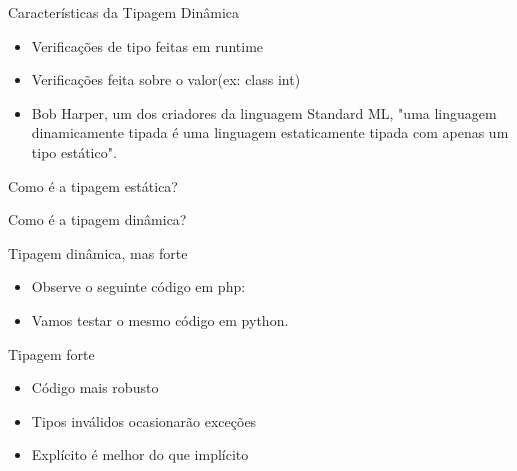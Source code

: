 \begin{frame}{Características da Tipagem Dinâmica}

\begin{itemize}
	\item Verificações de tipo feitas em runtime
	\item Verificações feita sobre o valor(ex: class int)
	\item Bob Harper, um dos criadores da linguagem Standard ML, "uma linguagem dinamicamente tipada é uma linguagem estaticamente tipada com apenas um tipo estático".
\end{itemize}
\end{frame}

\begin{frame}{Como é a tipagem estática?}

\centering {}
\lstset{language=Java}

      
\end{frame}

\begin{frame}{Como é a tipagem dinâmica?}

\centering {}
\lstset{language=Python}


\end{frame}

\begin{frame}{Tipagem dinâmica, mas forte}
\begin{itemize}
	\item Observe o seguinte código em php:
	\lstset{language=php}
	
\end{itemize}
\begin{itemize}
	\item Vamos testar o mesmo código em python.
\end{itemize}

\end{frame}

\begin{frame}{Tipagem forte}
	\begin{itemize}
		\item Código mais robusto
		\item Tipos inválidos ocasionarão exceções
		\item Explícito é melhor do que implícito
	\end{itemize}
\end{frame}
